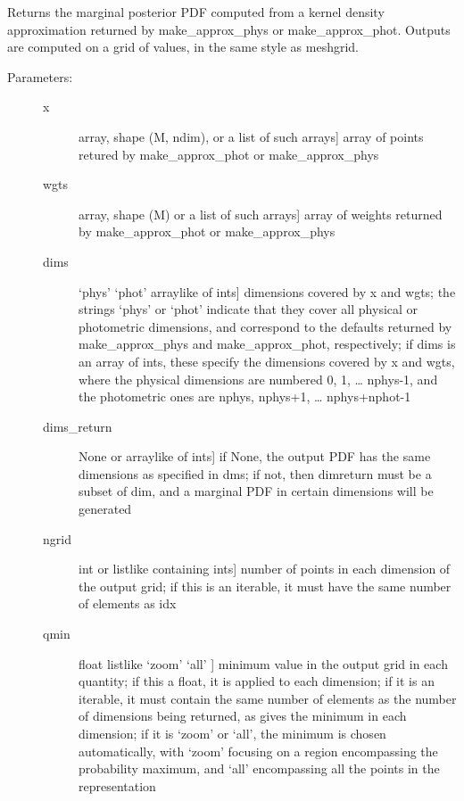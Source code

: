 \documentclass[letterpaper,10pt,english]{sphinxmanual}
\begin{document}
\begin{fulllineitems}
\begin{fulllineitems}
\label{\detokenize{bayesphot:slugpy.bayesphot.bp.bp.mpdf_approx}}
Returns the marginal posterior PDF computed from a kernel
density approximation returned by make\_approx\_phys or
make\_approx\_phot. Outputs are computed on a grid of values, in
the same style as meshgrid.
\begin{description}
\item[{Parameters:}] \leavevmode\begin{description}
\item[{x}] \leavevmode{[}array, shape (M, ndim), or a list of such arrays{]}
array of points retured by make\_approx\_phot or
make\_approx\_phys

\item[{wgts}] \leavevmode{[}array, shape (M) or a list of such arrays{]}
array of weights returned by make\_approx\_phot or
make\_approx\_phys

\item[{dims}] \leavevmode{[}‘phys’ \textbar{} ‘phot’ \textbar{} arraylike of ints{]}
dimensions covered by x and wgts; the strings ‘phys’ or
‘phot’ indicate that they cover all physical or
photometric dimensions, and correspond to the defaults
returned by make\_approx\_phys and make\_approx\_phot,
respectively; if dims is an array of ints, these specify
the dimensions covered by x and wgts, where the
physical dimensions are numbered 0, 1, … nphys-1, and
the photometric ones are nphys, nphys+1,
… nphys+nphot-1

\item[{dims\_return}] \leavevmode{[}None or arraylike of ints{]}
if None, the output PDF has the same dimensions as
specified in dms; if not, then dimreturn must be a
subset of dim, and a marginal PDF in certain dimensions
will be generated

\item[{ngrid}] \leavevmode{[}int or listlike containing ints{]}
number of points in each dimension of the output grid;
if this is an iterable, it must have the same number of
elements as idx

\item[{qmin}] \leavevmode{[}float \textbar{} listlike \textbar{} ‘zoom’ \textbar{} ‘all’ {]}
minimum value in the output grid in each quantity; if
this a float, it is applied to each dimension; if it is
an iterable, it must contain the same number of elements
as the number of dimensions being returned, as gives the
minimum in each dimension; if it is ‘zoom’ or ‘all’, the
minimum is chosen automatically, with ‘zoom’ focusing on
a region encompassing the probability maximum, and ‘all’
encompassing all the points in the representation


\end{description}
\end{description}
\end{fulllineitems}
\end{fulllineitems}
\end{document}
